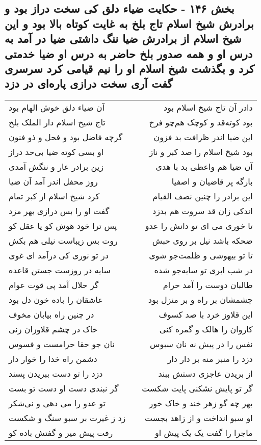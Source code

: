 \begin{center}
\section*{بخش ۱۴۶ - حکایت ضیاء دلق کی سخت دراز بود و برادرش شیخ اسلام تاج بلخ به غایت کوتاه بالا بود و این شیخ اسلام از برادرش ضیا ننگ داشتی ضیا در آمد به درس او و همه صدور بلخ حاضر به درس او ضیا خدمتی کرد و بگذشت شیخ اسلام او را نیم قیامی کرد سرسری گفت آری سخت درازی پاره‌ای در دزد}
\label{sec:sh146}
\begin{longtable}{l p{0.5cm} r}
آن ضیاء دلق خوش الهام بود
&&
دادر آن تاج شیخ اسلام بود
\\
تاج شیخ اسلام دار الملک بلخ
&&
بود کوته‌قد و کوچک هم‌چو فرخ
\\
گرچه فاضل بود و فحل و ذو فنون
&&
این ضیا اندر ظرافت بد فزون
\\
او بسی کوته ضیا بی‌حد دراز
&&
بود شیخ اسلام را صد کبر و ناز
\\
زین برادر عار و ننگش آمدی
&&
آن ضیا هم واعظی بد با هدی
\\
روز محفل اندر آمد آن ضیا
&&
بارگه پر قاضیان و اصفیا
\\
کرد شیخ اسلام از کبر تمام
&&
این برادر را چنین نصف القیام
\\
گفت او را بس درازی بهر مزد
&&
اندکی زان قد سروت هم بدزد
\\
پس ترا خود هوش کو یا عقل کو
&&
تا خوری می ای تو دانش را عدو
\\
روت بس زیباست نیلی هم بکش
&&
ضحکه باشد نیل بر روی حبش
\\
در تو نوری کی درآمد ای غوی
&&
تا تو بیهوشی و ظلمت‌جو شوی
\\
سایه در روزست جستن قاعده
&&
در شب ابری تو سایه‌جو شده
\\
گر حلال آمد پی قوت عوام
&&
طالبان دوست را آمد حرام
\\
عاشقان را باده خون دل بود
&&
چشمشان بر راه و بر منزل بود
\\
در چنین راه بیابان مخوف
&&
این قلاوز خرد با صد کسوف
\\
خاک در چشم قلاوزان زنی
&&
کاروان را هالک و گمره کنی
\\
نان جو حقا حرامست و فسوس
&&
نفس را در پیش نه نان سبوس
\\
دشمن راه خدا را خوار دار
&&
دزد را منبر منه بر دار دار
\\
دزد را تو دست ببریدن پسند
&&
از بریدن عاجزی دستش ببند
\\
گر نبندی دست او دست تو بست
&&
گر تو پایش نشکنی پایت شکست
\\
تو عدو را می دهی و نی‌شکر
&&
بهر چه گو زهر خند و خاک خور
\\
زد ز غیرت بر سبو سنگ و شکست
&&
او سبو انداخت و از زاهد بجست
\\
رفت پیش میر و گفتش باده کو
&&
ماجرا را گفت یک یک پیش او
\\
\end{longtable}
\end{center}
